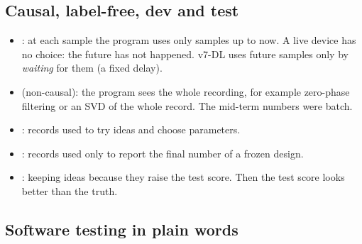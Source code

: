 \documentclass[11pt]{article}
\begin{document}
\subsection{Causal, label-free, dev and test}

\begin{itemize}
  \item {}: at each sample the program uses only samples up to now. A live device has no choice: the future has not happened. v7-DL uses future samples only by \emph{waiting} for them (a fixed delay).
  \item {} (non-causal): the program sees the whole recording, for example zero-phase filtering or an SVD of the whole record. The mid-term numbers were batch.
  \item {}: records used to try ideas and choose parameters.
  \item {}: records used only to report the final number of a frozen design.
  \item {}: keeping ideas because they raise the test score. Then the test score looks better than the truth.
\end{itemize}

\subsection{Software testing in plain words}
\end{document}
